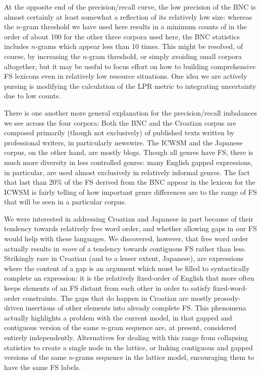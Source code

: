 \documentclass[11pt,letterpaper]{article}
\begin{document}
At the opposite end of the precision/recall curve, the low precision of the BNC is almost certainly at least somewhat a reflection of its relatively low size: whereas the $n$-gram threshold we have used here results in a minimum counts of in the order of about 100 for the other three corpora used here, the BNC statistics includes $n$-grams which appear less than 10 times. This might be resolved, of course, by increasing the $n$-gram threshold, or simply avoiding small corpora altogether, but it may be useful to focus effort on how to building comprehensive FS lexicons even in relatively low resource situations. One idea we are actively pursing is modifying the calculation of the LPR metric to integrating uncertainty due to low counts.

There is one another more general explanation for the precision/recall imbalances we see across the four corpora: Both the BNC and the Croatian corpus are composed primarily (though not exclusively) of published texts written by professional writers, in particularly newswire. The ICWSM and the Japanese corpus, on the other hand, are mostly blogs. Though all genres have FS, there is much more diversity in less controlled genres: many English gapped expressions, in particular, are used almost exclusively in relatively informal genres. The fact that last than 20\% of the FS derived from the BNC appear in the lexicon for the ICWSM is fairly telling of how important genre differences are to the range of FS that will be seen in a particular corpus.

We were interested in addressing Croatian and Japanese in part because of their tendency towards relatively free word order, and whether allowing gaps in our FS would help with these languages. We discovered, however, that free word order actually results in \emph{more} of a tendency towards contiguous FS rather than less. Strikingly rare in Croatian (and to a lesser extent, Japanese), are expressions where the content of a gap is an argument which must be filled to syntactically complete an expression: it is the relatively fixed-order of English that more often keeps elements of an FS distant from each other in order to satisfy fixed-word-order constraints. The gaps that do happen in Croatian are mostly prosody-driven insertions of other elements into already complete FS. This phenomena actually highlights a problem with the current model, in that gapped and contiguous version of the same $n$-gram sequence are, at present, considered entirely independently. Alternatives for dealing with this range from collapsing statistics to create a single node in the lattice, or linking contiguous and gapped versions of the same $n$-grams sequence in the lattice model, encouraging them to have the same FS labels.
\end{document}
